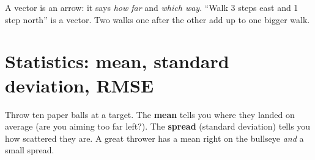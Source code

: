 \begin{kid}
A vector is an arrow: it says \emph{how far} and \emph{which way}. ``Walk 3 steps east and 1 step north'' is a vector. Two walks one after the other add up to one bigger walk.
\end{kid}

\section{Statistics: mean, standard deviation, RMSE}


\begin{kid}
Throw ten paper balls at a target. The \textbf{mean} tells you where they landed on average (are you aiming too far left?). The \textbf{spread} (standard deviation) tells you how scattered they are. A great thrower has a mean right on the bullseye \emph{and} a small spread.
\end{kid}
